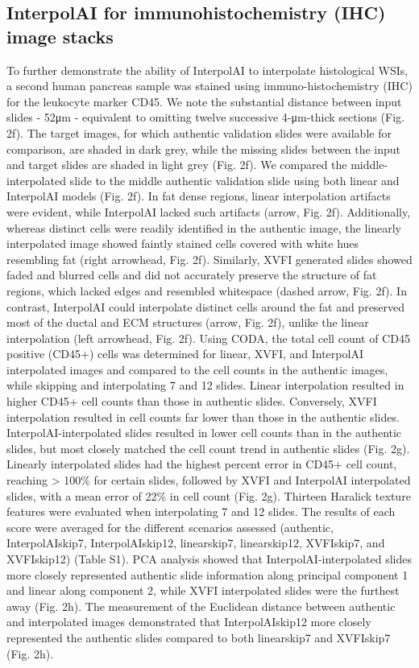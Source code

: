 \begin{refsection}
    \section{InterpolAI for immunohistochemistry (IHC) image stacks}
    To further demonstrate the ability of InterpolAI to interpolate histological WSIs, a second human pancreas sample was stained using immuno-histochemistry (IHC) for the leukocyte marker CD45. We note the substantial distance between input slides - 52μm - equivalent to omitting twelve successive 4-μm-thick sections (Fig. 2f). The target images, for which authentic validation slides were available for comparison, are shaded in dark grey, while the missing slides between the input and target slides are shaded in light grey (Fig. 2f). 
    We compared the middle-interpolated slide to the middle authentic validation slide using both linear and InterpolAI models (Fig. 2f). In fat dense regions, linear interpolation artifacts were evident, while InterpolAI lacked such artifacts (arrow, Fig. 2f). Additionally, whereas distinct cells were readily identified in the authentic image, the linearly interpolated image showed faintly stained cells covered with white hues resembling fat (right arrowhead, Fig. 2f). Similarly, XVFI generated slides showed faded and blurred cells and did not accurately preserve the structure of fat regions, which lacked edges and resembled whitespace (dashed arrow, Fig. 2f). In contrast, InterpolAI could interpolate distinct cells around the fat and preserved most of the ductal and ECM structures (arrow, Fig. 2f), unlike the linear interpolation (left arrowhead, Fig. 2f).
    Using CODA, the total cell count of CD45 positive (CD45+) cells was determined for linear, XVFI, and InterpolAI interpolated images and compared to the cell counts in the authentic images, while skipping and interpolating 7 and 12 slides. Linear interpolation resulted in higher CD45+ cell counts than those in authentic slides. Conversely, XVFI interpolation resulted in cell counts far lower than those in the authentic slides. InterpolAI-interpolated slides resulted in lower cell counts than in the authentic slides, but most closely matched the cell count trend in authentic slides (Fig. 2g). Linearly interpolated slides had the highest percent error in CD45+ cell count, reaching > 100\% for certain slides, followed by XVFI and InterpolAI interpolated slides, with a mean error of 22\% in cell count (Fig. 2g).
    Thirteen Haralick texture features were evaluated when interpolating 7 and 12 slides. The results of each score were averaged for the different scenarios assessed (authentic, InterpolAIskip7, InterpolAIskip12, linearskip7, linearskip12, XVFIskip7, and XVFIskip12) (Table S1). PCA analysis showed that InterpolAI-interpolated slides more closely represented authentic slide information along principal component 1 and linear along component 2, while XVFI interpolated slides were the furthest away (Fig. 2h). The measurement of the Euclidean distance between authentic and interpolated images demonstrated that InterpolAIskip12 more closely represented the authentic slides compared to both linearskip7 and XVFIskip7 (Fig. 2h).

\end{refsection}
